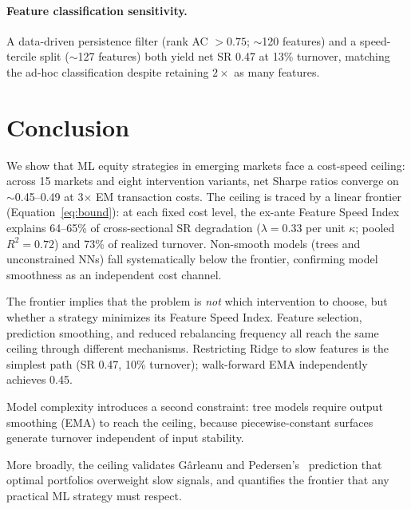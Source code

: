 \documentclass[sigconf,review,anonymous,balance=false]{acmart}
\begin{document}
\paragraph{Feature classification sensitivity.}
A data-driven persistence filter (rank AC $> 0.75$; ${\sim}$120
features) and a speed-tercile split (${\sim}$127 features) both yield
net SR 0.47 at 13\% turnover, matching the ad-hoc classification
despite retaining $2\times$ as many features.


\section{Conclusion}

We show that ML equity strategies in emerging markets face a
cost-speed ceiling: across 15 markets and eight intervention
variants, net Sharpe ratios converge on ${\sim}$0.45--0.49 at
3$\times$ EM transaction costs. The ceiling is traced by a linear
frontier (Equation~\ref{eq:bound}): at each fixed cost level, the
ex-ante Feature Speed Index explains 64--65\% of cross-sectional SR
degradation ($\lambda = 0.33$ per unit $\kappa$; pooled $R^2 = 0.72$)
and 73\% of realized turnover. Non-smooth models (trees and
unconstrained NNs) fall systematically below the frontier, confirming
model smoothness as an independent cost channel.

The frontier implies that the problem is \emph{not} which intervention to
choose, but whether a strategy minimizes its Feature Speed Index.
Feature selection, prediction smoothing, and reduced rebalancing
frequency all reach the same ceiling through different mechanisms.
Restricting Ridge to slow features is the simplest path (SR 0.47, 10\%
turnover); walk-forward EMA independently achieves 0.45.

Model complexity introduces a second constraint: tree models require
output smoothing (EMA) to reach the ceiling, because piecewise-constant
surfaces generate turnover independent of input stability.

More broadly,
the ceiling validates G\^{a}rleanu and
Pedersen's~\cite{garleanu2013dynamic} prediction that optimal
portfolios overweight slow signals, and quantifies the frontier that
any practical ML strategy must respect.


\begin{acks}
\end{acks}




\end{document}
